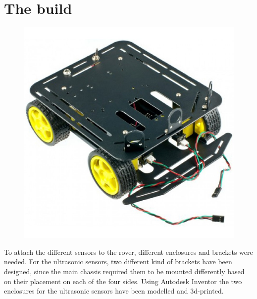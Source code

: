\clearpage
\section{The build}

\begin{figure}[H]
	\centering
	\includegraphics[width=.4\linewidth]{images/chassis.jpg}
\end{figure}

To attach the different sensors to the rover, different enclosures and brackets were needed. For the ultrasonic sensors, two different kind of brackets have been designed, since the main chassis required them to be mounted differently based on their placement on each of the four sides. Using Autodesk Inventor the two enclosures for the ultrasonic sensors have been modelled and 3d-printed.

